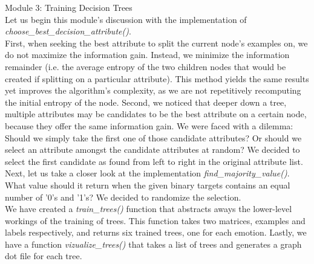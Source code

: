 Module 3: Training Decision Trees \\
Let us begin this module's discussion with the implementation of \emph{choose\_best\_decision\_attribute()}. \\
First, when seeking the best attribute to split the current node's examples on, we do not maximize the information gain.
Instead, we minimize the information remainder (i.e. the average entropy of the two children nodes
that would be created if splitting on a particular attribute).
This method yields the same results yet improves the algorithm's complexity,
as we are not repetitively recomputing the initial entropy of the node.
Second, we noticed that deeper down a tree, multiple attributes may be candidates to be the best attribute on a certain node,
because they offer the same information gain. We were faced with a dilemma: Should we simply
take the first one of those candidate attributes? Or should we select an attribute amongst the candidate attributes at random?
We decided to select the first candidate as found from left to right in the original attribute list.\\
Next, let us take a closer look at the implementation \emph{find\_majority\_value()}.\\
What value should it return when the given binary targets contains an equal number of
'0's and '1's? We decided to randomize the selection.\\
We have created a \emph{train\_trees()} function that abstracts aways the lower-level workings of the training
of trees. This function takes two matrices, examples and labels respectively,
and returns six trained trees, one for each emotion.
Lastly, we have a function \emph{vizualize\_trees()} that takes a list of trees and generates a graph dot file
for each tree.

